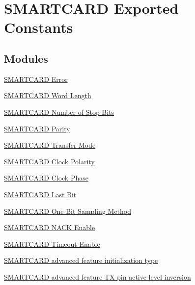 \hypertarget{group___s_m_a_r_t_c_a_r_d___exported___constants}{}\section{S\+M\+A\+R\+T\+C\+A\+RD Exported Constants}
\label{group___s_m_a_r_t_c_a_r_d___exported___constants}
\subsection*{Modules}
\begin{DoxyCompactItemize}
\item 
\hyperlink{group___s_m_a_r_t_c_a_r_d___error}{S\+M\+A\+R\+T\+C\+A\+R\+D Error}
\item 
\hyperlink{group___s_m_a_r_t_c_a_r_d___word___length}{S\+M\+A\+R\+T\+C\+A\+R\+D Word Length}
\item 
\hyperlink{group___s_m_a_r_t_c_a_r_d___stop___bits}{S\+M\+A\+R\+T\+C\+A\+R\+D Number of Stop Bits}
\item 
\hyperlink{group___s_m_a_r_t_c_a_r_d___parity}{S\+M\+A\+R\+T\+C\+A\+R\+D Parity}
\item 
\hyperlink{group___s_m_a_r_t_c_a_r_d___mode}{S\+M\+A\+R\+T\+C\+A\+R\+D Transfer Mode}
\item 
\hyperlink{group___s_m_a_r_t_c_a_r_d___clock___polarity}{S\+M\+A\+R\+T\+C\+A\+R\+D Clock Polarity}
\item 
\hyperlink{group___s_m_a_r_t_c_a_r_d___clock___phase}{S\+M\+A\+R\+T\+C\+A\+R\+D Clock Phase}
\item 
\hyperlink{group___s_m_a_r_t_c_a_r_d___last___bit}{S\+M\+A\+R\+T\+C\+A\+R\+D Last Bit}
\item 
\hyperlink{group___s_m_a_r_t_c_a_r_d___one_bit___sampling}{S\+M\+A\+R\+T\+C\+A\+R\+D One Bit Sampling Method}
\item 
\hyperlink{group___s_m_a_r_t_c_a_r_d___n_a_c_k___enable}{S\+M\+A\+R\+T\+C\+A\+R\+D N\+A\+C\+K Enable}
\item 
\hyperlink{group___s_m_a_r_t_c_a_r_d___timeout___enable}{S\+M\+A\+R\+T\+C\+A\+R\+D Timeout Enable}
\item 
\hyperlink{group___s_m_a_r_t_c_a_r_d___advanced___features___initialization___type}{S\+M\+A\+R\+T\+C\+A\+R\+D advanced feature initialization type}
\item 
\hyperlink{group___s_m_a_r_t_c_a_r_d___tx___inv}{S\+M\+A\+R\+T\+C\+A\+R\+D advanced feature T\+X pin active level inversion}
\item 

\end{DoxyCompactItemize}
